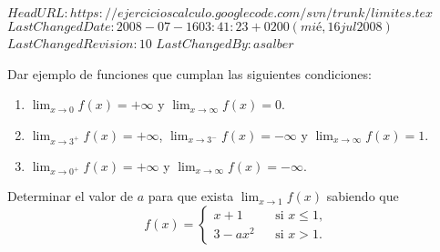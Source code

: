 \svnidlong
{$HeadURL: https://ejercicioscalculo.googlecode.com/svn/trunk/limites.tex $}
{$LastChangedDate: 2008-07-16 03:41:23 +0200 (mié, 16 jul 2008) $}
{$LastChangedRevision: 10 $}
{$LastChangedBy: asalber $}
%
{Dar ejemplo de funciones que cumplan las siguientes condiciones:
\begin{enumerate}
  \item $\lim_{x\rightarrow 0}f(x)=+\infty$ y $\lim_{x\rightarrow
  \infty}f(x)=0$.

  \item $\lim_{x\rightarrow 3^+}f(x)=+\infty$, $\lim_{x\rightarrow
  3^-}f(x)=-\infty$ y $\lim_{x\rightarrow \infty}f(x)=1$.

  \item $\lim_{x\rightarrow 0^+}f(x)=+\infty$ y $\lim_{x\rightarrow
  \infty}f(x)=-\infty$.
\end{enumerate}
}


{Determinar el valor de $a$ para que exista $\lim_{x\rightarrow 1}f(x)$ sabiendo que
\[ f(x)=\left\{
  \begin{array}{lll}
    x+1 & & \mbox{si }x\leq 1,\\
    3-ax^2 & & \mbox{si } x>1.
  \end{array}
   \right.
\]
}


